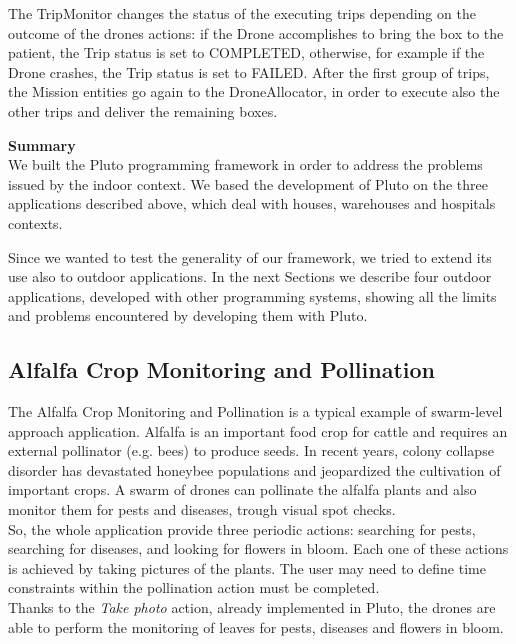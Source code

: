 The TripMonitor changes the status of the executing trips depending on the outcome of the drones actions:
if the Drone accomplishes to bring the box to the patient, the Trip status is set to COMPLETED, otherwise, for example if the Drone crashes, the Trip status is set to FAILED.
After the first group of trips, the Mission entities go again to the DroneAllocator, in order to execute also the other trips and deliver the remaining boxes.

\textbf{Summary}
\\

We built the Pluto programming framework in order to address the problems issued by the indoor context.
We based the development of Pluto on the three applications described above, which deal with houses, warehouses and hospitals contexts.

Since we wanted to test the generality of our framework, we tried to extend its use also to outdoor applications.
In the next Sections we describe four outdoor applications, developed with other programming systems, showing all the limits and problems encountered by developing them with Pluto.

\subsection{Alfalfa Crop Monitoring and Pollination}\label{alfalfa}

The Alfalfa Crop Monitoring and Pollination\cite{alfalfa} is a typical example of swarm-level approach application.
Alfalfa is an important food crop for cattle and requires an external pollinator (e.g. bees) to produce seeds. In recent years, colony collapse disorder has devastated honeybee populations and jeopardized the cultivation of important crops\cite{colony}.
A swarm of drones can pollinate the alfalfa plants and also monitor them for pests and diseases, trough visual spot checks.
\\
So, the whole application provide three periodic actions: searching for pests, searching for diseases, and looking for flowers in bloom.
Each one of these actions is achieved by taking pictures of the plants.
The user may need to define time constraints within the pollination action must be completed.
\\
Thanks to the \textit{Take photo} action, already implemented in Pluto, the drones are able to perform the monitoring of leaves for pests, diseases and flowers in bloom.
\\

